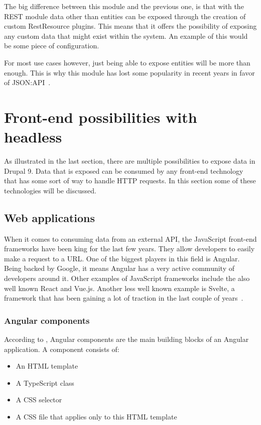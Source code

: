 The big difference between this module and the previous one, is that with the REST module data other than entities can be exposed through the creation of custom RestResource plugins. This means that it offers the possibility of exposing any custom data that might exist within the system. An example of this would be some piece of configuration.

For most use cases however, just being able to expose entities will be more than enough. This is why this module has lost some popularity in recent years in favor of JSON:API~\autocite{So2018}.


\section{Front-end possibilities with headless}

As illustrated in the last section, there are multiple possibilities to expose data in Drupal 9. Data that is exposed can be consumed by any front-end technology that has some sort of way to handle HTTP requests. In this section some of these technologies will be discussed.

\subsection{Web applications}

When it comes to consuming data from an external API, the JavaScript front-end frameworks have been king for the last few years. They allow developers to easily make a request to a URL. One of the biggest players in this field is Angular. Being backed by Google, it means Angular has a very active community of developers around it. Other examples of JavaScript frameworks include the also well known React and Vue.js. Another less well known example is Svelte, a framework that has been gaining a lot of traction in the last couple of years~\autocite{Uzayr2019}.

\subsubsection{Angular components}

According to \textcite{Freeman2020}, Angular components are the main building blocks of an Angular application. A component consists of:

\begin{itemize}
	\item An HTML template
	\item A TypeScript class
	\item A CSS selector
	\item A CSS file that applies only to this HTML template
\end{itemize}




